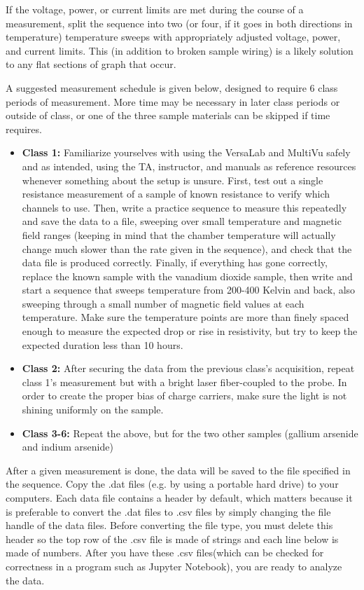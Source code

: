 \documentclass{article}
\begin{document}
If the voltage, power, or current limits are met during the course of a measurement, split the sequence into two (or four, if it goes in both directions in temperature) temperature sweeps with appropriately adjusted voltage, power, and current limits. This (in addition to broken sample wiring) is a likely solution to any flat sections of graph that occur.

A suggested measurement schedule is given below, designed to require 6 class periods of measurement. More time may be necessary in later class periods or outside of class, or one of the three sample materials can be skipped if time requires.

\begin{itemize}
    \item \textbf{Class 1:} Familiarize yourselves with using the VersaLab and MultiVu safely and as intended, using the TA, instructor, and manuals as reference resources whenever something about the setup is unsure. First, test out a single resistance measurement of a sample of known resistance to verify which channels to use. Then, write a practice sequence to measure this repeatedly and save the data to a file, sweeping over small temperature and magnetic field ranges (keeping in mind that the chamber temperature will actually change much slower than the rate given in the sequence), and check that the data file is produced correctly. Finally, if everything has gone correctly, replace the known sample with the vanadium dioxide sample, then write and start a sequence that sweeps temperature from 200-400 Kelvin and back, also sweeping through a small number of magnetic field values at each temperature. Make sure the temperature points are more than finely spaced enough to measure the expected drop or rise in resistivity, but try to keep the expected duration less than 10 hours.
    \item \textbf{Class 2:} After securing the data from the previous class's acquisition, repeat class 1's measurement but with a bright laser fiber-coupled to the probe. In order to create the proper bias of charge carriers, make sure the light is not shining uniformly on the sample.
    \item \textbf{Class 3-6:} Repeat the above, but for the two other samples (gallium arsenide and indium arsenide)
\end{itemize}

After a given measurement is done, the data will be saved to the file specified in the sequence. Copy the .dat files (e.g. by using a portable hard drive) to your computers. Each data file contains a header by default, which matters because it is preferable to convert the .dat files to .csv files by simply changing the file handle of the data files. Before converting the file type, you must delete this header so the top row of the .csv file is made of strings and each line below is made of numbers. After you have these .csv files(which can be checked for correctness in a program such as Jupyter Notebook), you are ready to analyze the data.
\end{document}
